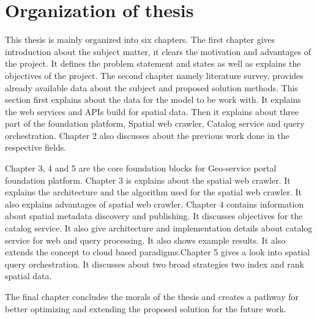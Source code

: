 \section{Organization of thesis}
This thesis is mainly organized into six chapters. The first chapter gives introduction about the subject matter, it clears the motivation and advantages of the project. It defines the problem statement and states as well as explains the objectives of the project. The second chapter namely literature survey, provides already available data about the subject and proposed solution methods. This section first explains about the data for the model to be work with. It explains the web services and APIs build for spatial data. Then it explains about three part of the foundation platform, Spatial web crawler, Catalog service and query orchestration. Chapter 2 also discusses about the previous work done in the respective fields. 
\newline
\par 
Chapter 3, 4 and 5 are the core foundation blocks for Geo-service portal foundation platform. Chapter 3 is explains about the spatial web crawler. It explains the architecture and the algorithm used for the spatial web crawler. It also explains advantages of spatial web crawler. Chapter 4 contains information about spatial metadata discovery and publishing. It discusses objectives for the catalog service. It also give architecture and implementation details about catalog service for web and query processing. It also shows example results. It also extends the concept to cloud based paradigms.Chapter 5 gives a look into spatial query orchestration. It discusses about two broad strategies two index and rank spatial data.
\newline
\par
The final chapter concludes the morals of the thesis and creates a pathway for better optimizing and extending the proposed solution for the future work.
